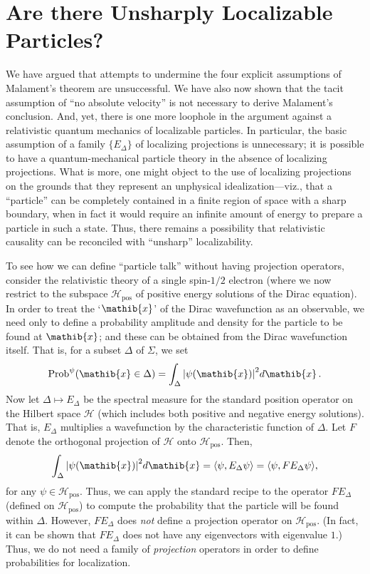 \documentclass[11pt]{article}
\theoremstyle{remark}
\newcommand{\abs}[1]{\mbox{$|#1|$}}
\newcommand{\hil}[1]{\mathcal{#1}}
\begin{document}
\section{Are there Unsharply Localizable Particles?} \label{unsharp}
We have argued that attempts to undermine the four explicit
assumptions of Malament's theorem are unsuccessful.  We have also now
shown that the tacit assumption of ``no absolute velocity'' is not
necessary to derive Malament's conclusion.  And, yet, there is one
more loophole in the argument against a relativistic quantum mechanics
of localizable particles.  In particular, the basic assumption of a
family $\{ E_{\Delta} \}$ of localizing projections is unnecessary; it
is possible to have a quantum-mechanical particle theory in the
absence of localizing projections.  What is more, one might object to
the use of localizing projections on the grounds that they represent
an unphysical idealization---viz., that a ``particle'' can be
completely contained in a finite region of space with a sharp
boundary, when in fact it would require an infinite amount of energy
to prepare a particle in such a state.  Thus, there remains a
possibility that relativistic causality can be reconciled with
``unsharp'' localizability.

To see how we can define ``particle talk'' without having projection
operators, consider the relativistic theory of a single spin-$1/2$
electron (where we now restrict to the subspace
$\hil{H}_{\mathrm{pos}}$ of positive energy solutions of the Dirac
equation).  In order to treat the `$\mathib{x}$' of the Dirac
wavefunction as an observable, we need only to define a probability
amplitude and density for the particle to be found at $\mathib{x}$;
and these can be obtained from the Dirac wavefunction itself.  That
is, for a subset $\Delta$ of $\Sigma$, we set \begin{equation}
  \mathrm{Prob}^{\psi}(\mathib{x}\in \Delta)=\int _{\Delta}\abs{\psi
    (\mathib{x})}^{2}d\mathib{x} \,. \end{equation} Now let $\Delta
\mapsto E_{\Delta}$ be the spectral measure for the standard position
operator on the Hilbert space $\hil{H}$ (which includes both positive
and negative energy solutions).  That is, $E_{\Delta}$ multiplies a
wavefunction by the characteristic function of $\Delta$.  Let $F$
denote the orthogonal projection of $\hil{H}$ onto
$\hil{H}_{\mathrm{pos}}$.  Then,
\begin{equation} \int _{\Delta}\abs{\psi
    (\mathib{x})}^{2}d\mathib{x}=\langle \psi ,E_{\Delta}\psi
  \rangle =\langle \psi ,FE_{\Delta}\psi \rangle,\end{equation} 
for any $\psi \in \hil{H}_{\mathrm{pos}}$.  Thus, we can apply the standard recipe to
the operator $FE_{\Delta}$ (defined on $\hil{H}_{\mathrm{pos}}$)
to compute the probability that the particle will be found within
$\Delta$.  However, $FE_{\Delta}$ does \emph{not} define a projection operator
on $\hil{H}_{\mathrm{pos}}$.  (In fact, it can be shown that
$FE_{\Delta}$ does not have any eigenvectors with eigenvalue $1$.)
Thus, we do not need a family of \emph{projection} operators in order
to define probabilities for localization. 
\end{document}
